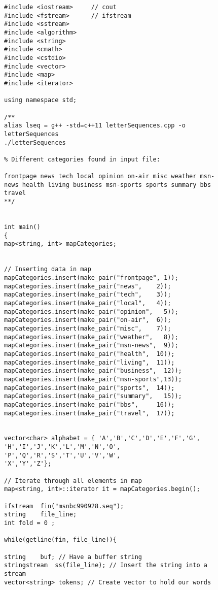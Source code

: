 \begin{figure}[t]%
	\centering
	
	

\begin{lstlisting}[frame=single,basicstyle=\ttfamily\tiny,]
#include <iostream>     // cout
#include <fstream>      // ifstream
#include <sstream>
#include <algorithm>
#include <string>
#include <cmath>
#include <cstdio>
#include <vector>
#include <map>
#include <iterator>

using namespace std;

/** 
alias lseq = g++ -std=c++11 letterSequences.cpp -o letterSequences 
./letterSequences

% Different categories found in input file:

frontpage news tech local opinion on-air misc weather msn-news health living business msn-sports sports summary bbs travel
**/


int main()
{
map<string, int> mapCategories;


// Inserting data in map
mapCategories.insert(make_pair("frontpage", 1));
mapCategories.insert(make_pair("news",    2));
mapCategories.insert(make_pair("tech",    3));
mapCategories.insert(make_pair("local",   4));
mapCategories.insert(make_pair("opinion",   5));
mapCategories.insert(make_pair("on-air",  6));
mapCategories.insert(make_pair("misc",    7));
mapCategories.insert(make_pair("weather",   8));
mapCategories.insert(make_pair("msn-news",  9));
mapCategories.insert(make_pair("health",  10));
mapCategories.insert(make_pair("living",  11));
mapCategories.insert(make_pair("business",  12));
mapCategories.insert(make_pair("msn-sports",13));
mapCategories.insert(make_pair("sports",  14));
mapCategories.insert(make_pair("summary",   15));
mapCategories.insert(make_pair("bbs",     16));
mapCategories.insert(make_pair("travel",  17));


vector<char> alphabet = { 'A','B','C','D','E','F','G',
'H','I','J','K','L','M','N','O',
'P','Q','R','S','T','U','V','W',
'X','Y','Z'};

// Iterate through all elements in map
map<string, int>::iterator it = mapCategories.begin();

ifstream  fin("msnbc990928.seq");
string    file_line;
int fold = 0 ;

while(getline(fin, file_line)){

string    buf; // Have a buffer string
stringstream  ss(file_line); // Insert the string into a stream
vector<string> tokens; // Create vector to hold our words


\end{lstlisting}
\end{figure}
